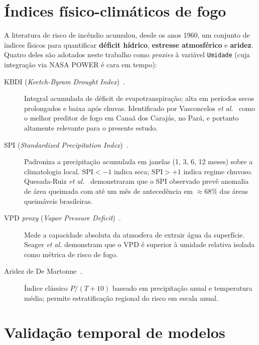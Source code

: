 \section{Índices físico-climáticos de fogo}
\label{sec:fund_indices_fogo}

A literatura de risco de incêndio acumulou, desde os anos 1960, um conjunto de índices físicos para quantificar \textbf{déficit hídrico}, \textbf{estresse atmosférico} e \textbf{aridez}. Quatro deles são adotados neste trabalho como \emph{proxies} à variável \texttt{Umidade} (cuja integração via NASA POWER é cara em tempo):

\begin{description}
  \item[KBDI (\emph{Keetch-Byram Drought Index})~\cite{keetch1968drought}.] Integral acumulada de déficit de evapotranspiração; alta em períodos secos prolongados e baixa após chuvas. Identificado por Vasconcelos \emph{et al.}~\cite{forests2024cerradoamazon} como o melhor preditor de fogo em Canaã dos Carajás, no Pará, e portanto altamente relevante para o presente estudo.

  \item[SPI (\emph{Standardized Precipitation Index})~\cite{mckee1993spi}.] Padroniza a precipitação acumulada em janelas (1, 3, 6, 12 meses) sobre a climatologia local. \(\text{SPI} < -1\) indica seca; \(\text{SPI} > +1\) indica regime chuvoso. Quesada-Ruiz \emph{et al.}~\cite{npjhazards2025fire} demonstraram que o SPI observado prevê anomalia de área queimada com até um mês de antecedência em \(\approx 68\%\) das áreas queimáveis brasileiras.

  \item[VPD \emph{proxy} (\emph{Vapor Pressure Deficit})~\cite{seager2015climatology}.] Mede a capacidade absoluta da atmosfera de extrair água da superfície. Seager \emph{et al.} demonstram que o VPD é superior à umidade relativa isolada como métrica de risco de fogo.

  \item[Aridez de De Martonne~\cite{demartonne1926aridity}.] Índice clássico \(P / (T + 10)\) baseado em precipitação anual e temperatura média; permite estratificação regional do risco em escala anual.
\end{description}

\section{Validação temporal de modelos}
\label{sec:fund_validacao_temporal}

